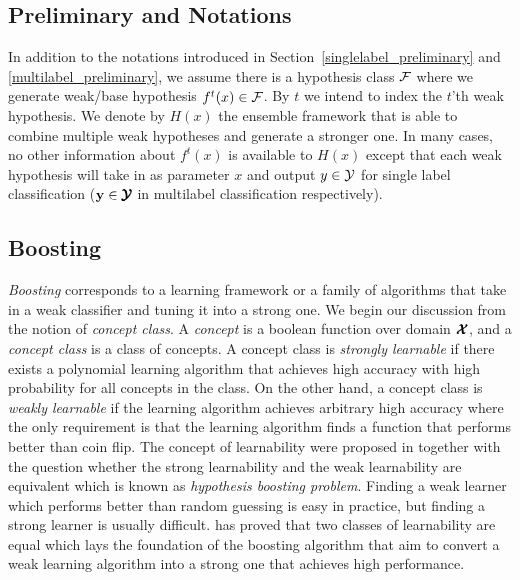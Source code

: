 {\subsection{Preliminary and Notations} \label{sc_em_pn}

In addition to the notations introduced in Section~\ref{singlelabel_preliminary} and \ref{multilabel_preliminary}, we assume there is a hypothesis class $\mathcal{F}$ where we generate weak/base hypothesis $f^t(x)\in\mathcal{F}$.
By $t$ we intend to index the $t$'th weak hypothesis.
We denote by $H(x)$ the ensemble framework that is able to combine multiple weak hypotheses and generate a stronger one.
In many cases, no other information about $f^t(x)$ is available to $H(x)$ except that each weak hypothesis will take in as parameter $x$ and output $y\in\mathcal{Y}$ for single label classification ($\mathbf {y}\in\pmb {\mathcal{Y}}$ in multilabel classification respectively).

\subsection{Boosting} \label{sc_boosting}

\textit{Boosting} corresponds to a learning framework or a family of algorithms that take in a weak classifier and tuning it into a strong one.
We begin our discussion from the notion of  \textit{concept class}.
A \textit{concept} is a boolean function over domain $\pmb {\mathcal{X}}$, and a \textit{concept class} is a class of concepts.
A concept class is \textit{strongly learnable} if there exists a polynomial learning algorithm that achieves high accuracy with high probability for all concepts in the class.
On the other hand, a concept class is \textit{weakly learnable} if the learning algorithm achieves arbitrary high accuracy where the only requirement is that the learning algorithm finds a function that performs better than coin flip.
The concept of learnability were proposed in \citep{Kearns94cryptographic} together with the question whether the strong learnability and the weak learnability are equivalent which is known as \textit{hypothesis boosting problem}.
Finding a weak learner which performs better than random guessing is easy in practice, but finding a strong learner is usually difficult.
\citet{Schapire90the} has proved that two classes of learnability are equal which lays the foundation of the boosting algorithm that aim to convert a weak learning algorithm into a strong one that achieves high performance.

}
